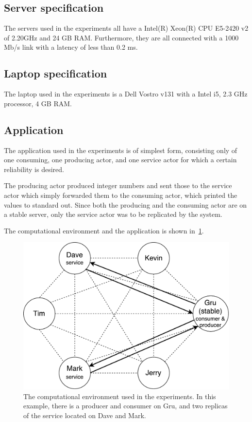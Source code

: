 \documentclass{cslthse-msc}
\begin{document}
\subsection{Server specification} \label{sec:server_spec}
The servers used in the experiments all have a Intel(R) Xeon(R) CPU E5-2420 v2 of 2.20GHz and 24 GB RAM. Furthermore, they are all connected with a 1000 Mb/s link with a latency of less than 0.2 ms. 

\subsection{Laptop specification} \label{sec:laptop_spec}
The laptop used in the experiments is a Dell Vostro v131 with a Intel i5, 2.3 GHz processor, 4 GB RAM. 

\subsection{Application} \label{sec:eval_application}
The application used in the experiments is of simplest form, consisting only of one consuming, one producing actor, and one service actor for which a certain reliability is desired. 

The producing actor produced integer numbers and sent those to the  service actor which simply forwarded them to the consuming actor, which printed the values to standard out. Since both the producing and the consuming actor are on a stable server, only the service actor was to be replicated by the system.

The computational environment and the application is shown in~\cref{fig:evaluation_application}.

\begin{figure}[!hbt]
\centering
\includegraphics[scale=0.5]{images/evaluation_application.pdf} 
\caption{The computational environment used in the experiments. In this example, there is a producer and consumer on Gru, and two replicas of the service located on Dave and Mark.} \label{fig:evaluation_application}
\end{figure}
\end{document}
